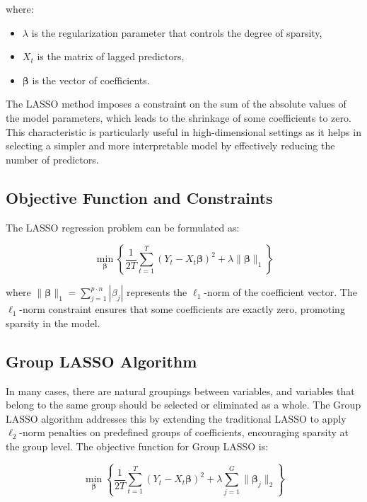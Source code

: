 \documentclass[11pt]{article}
\begin{document}
where:
\begin{itemize}
    \item \(\lambda\) is the regularization parameter that controls the degree of sparsity,
    \item \(X_t\) is the matrix of lagged predictors,
    \item \(\boldsymbol{\beta}\) is the vector of coefficients.
\end{itemize}

The LASSO method imposes a constraint on the sum of the absolute values of the model parameters, which leads to the shrinkage of some coefficients to zero. This characteristic is particularly useful in high-dimensional settings as it helps in selecting a simpler and more interpretable model by effectively reducing the number of predictors.

\subsection{Objective Function and Constraints}

The LASSO regression problem can be formulated as:

\begin{equation}
\min_{\boldsymbol{\beta}} \left\{ \frac{1}{2T} \sum_{t=1}^T \left( Y_t - X_t \boldsymbol{\beta} \right)^2 + \lambda \|\boldsymbol{\beta}\|_1 \right\}
\end{equation}

where \(\|\boldsymbol{\beta}\|_1 = \sum_{j=1}^{p \cdot n} |\beta_j|\) represents the \(\ell_1\)-norm of the coefficient vector. The \(\ell_1\)-norm constraint ensures that some coefficients are exactly zero, promoting sparsity in the model.

\subsection{Group LASSO Algorithm}

In many cases, there are natural groupings between variables, and variables that belong to the same group should be selected or eliminated as a whole. The Group LASSO algorithm addresses this by extending the traditional LASSO to apply \(\ell_2\)-norm penalties on predefined groups of coefficients, encouraging sparsity at the group level. The objective function for Group LASSO is:

\begin{equation}
\min_{\boldsymbol{\beta}} \left\{ \frac{1}{2T} \sum_{t=1}^T \left( Y_t - X_t \boldsymbol{\beta} \right)^2 + \lambda \sum_{j=1}^G \|\boldsymbol{\beta}_j\|_2 \right\}
\end{equation}
\end{document}
